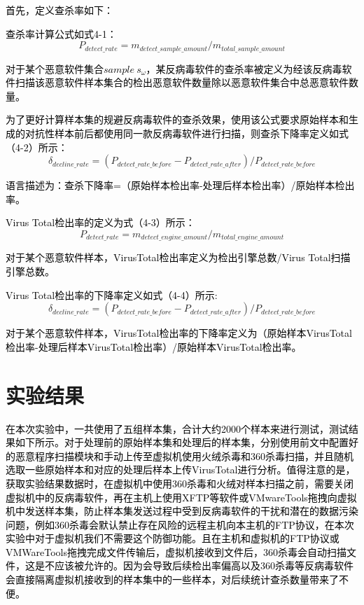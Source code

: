 \textcolor{black}{首先，定义查杀率如下：}

\textcolor{black}{查杀率计算公式如式4-1：}
\begin{equation}
P_{detect\_rate}=m_{detect\_sample\_amount}/m_{total\_sample\_amount}
\end{equation}

\textcolor{black}{对于某个恶意软件集合$sample\ s_{\omega}$，某反病毒软件的查杀率被定义为经该反病毒软件扫描该恶意软件样本集合的检出恶意软件数量除以恶意软件集合中总恶意软件数量。}

\textcolor{black}{为了更好计算样本集的规避反病毒软件的查杀效果，使用该公式要求原始样本和生成的对抗性样本前后都使用同一款反病毒软件进行扫描，则查杀下降率定义如式（4-2）所示：}
\begin{equation}
\delta_{decline\_rate}=(P_{detect\_rate\_before}-P_{detect\_rate\_after})/P_{detect\_rate\_before}
\end{equation}

\textcolor{black}{语言描述为：查杀下降率=（原始样本检出率-处理后样本检出率）/原始样本检出率。}

\textcolor{black}{Virus Total检出率的定义为式（4-3）所示： }
\begin{equation}
P_{detect\_rate}=m_{detect\_engine\_amount}/m_{total\_engine\_amount}
\end{equation}

\textcolor{black}{对于某个恶意软件样本，VirusTotal检出率定义为检出引擎总数/Virus Total扫描引擎总数。}

\textcolor{black}{Virus Total检出率的下降率定义如式（4-4）所示:}
\begin{equation}
    \delta_{decline\_rate}=(P_{detect\_rate\_before}-P_{detect\_rate\_after})/P_{detect\_rate\_before}
\end{equation}

\textcolor{black}{对于某个恶意软件样本，VirusTotal检出率的下降率定义为（原始样本VirusTotal检出率-处理后样本VirusTotal检出率）/原始样本VirusTotal检出率。}

\section{实验结果}

\textcolor{black}{在本次实验中，一共使用了五组样本集，合计大约2000个样本来进行测试，测试结果如下所示。对于处理前的原始样本集和处理后的样本集，分别使用前文中配置好的恶意程序扫描模块和手动上传至虚拟机使用火绒杀毒和360杀毒扫描，并且随机选取一些原始样本和对应的处理后样本上传VirusTotal进行分析。值得注意的是，获取实验结果数据时，在虚拟机中使用360杀毒和火绒对样本扫描之前，需要关闭虚拟机中的反病毒软件，再在主机上使用XFTP等软件或VMwareTools拖拽向虚拟机中发送样本集，防止样本集发送过程中受到反病毒软件的干扰和潜在的数据污染问题，例如360杀毒会默认禁止存在风险的远程主机向本主机的FTP协议，在本次实验中对于虚拟机我们不需要这个防御功能。且在主机和虚拟机的FTP协议或VMWareTools拖拽完成文件传输后，虚拟机接收到文件后，360杀毒会自动扫描文件，这是不应该被允许的。因为会导致后续检出率偏高以及360杀毒等反病毒软件会直接隔离虚拟机接收到的样本集中的一些样本，对后续统计查杀数量带来了不便。}

